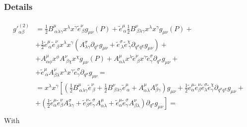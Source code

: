 \documentclass[letterpaper,10pt,english]{jupyterBook}
\begin{document}
\subsubsection*{Details}
\begin{equation*}
\begin{split}\begin{aligned}
   {g'}_{\alpha \beta}^{(2)} & =
   \frac{1}{2} B^{\mu}_{\ \alpha \lambda \gamma} x^\lambda x^\gamma \widetilde{e}^{\nu}_{\ \beta} g_{\mu \nu}(P) +
   \widetilde{e}^{\mu}_{\ \alpha} \frac{1}{2} B^{\nu}_{\ \beta \lambda \gamma} x^\lambda x^\gamma g_{\mu \nu}(P) + \\
   & + \frac{1}{2} \widetilde{e}^{\mu}_{\ \alpha} \widetilde{e}^{\nu}_{\ \beta} x^\lambda x^\gamma \left( A^{\sigma}_{\lambda \gamma} \partial_{q^\sigma} g_{\mu \nu} + \widetilde{e}^{\sigma}_{\ \lambda} \widetilde{e}^{\chi}_{\ \gamma} \partial_{q^\sigma q^\chi} g_{\mu \nu}  \right) + \\
   & + 
   A^{\mu}_{\alpha \phi} x^\phi A^{\nu}_{\ \beta \chi} x^\chi g_{\mu \nu}(P) +
   A^{\mu}_{\alpha \lambda} x^\lambda \widetilde{e}^{\nu}_{\ \beta} x^\gamma \widetilde{e}^{\sigma}_{\gamma} \partial_{q^\sigma} g_{\mu \nu} + \\
   & + \widetilde{e}^{\mu}_{\ \alpha} A^{\nu}_{\beta \lambda} x^\lambda x^\gamma \widetilde{e}^{\sigma}_{\gamma} \partial_{q^\sigma} g_{\mu \nu} = \\
   & = x^\lambda x^\gamma \left[ \left( \frac{1}{2} B^{\mu}_{\ \alpha \lambda \gamma} \widetilde{e}^{\nu}_{\ \beta} + \frac{1}{2} B^{\nu}_{\ \beta \lambda \gamma} \widetilde{e}^{\mu}_{\ \alpha} + A^{\mu}_{\alpha \lambda} A^{\nu}_{\beta \gamma} \right) g_{\mu \nu}  
   + \frac{1}{2} \widetilde{e}^{\mu}_{\alpha} \widetilde{e}^{\nu}_{\beta} \widetilde{e}^{\sigma}_{\lambda} \widetilde{e}^{\chi}_{\gamma} \partial_{q^\sigma q^\chi} g_{\mu \nu} \right. + \\ 
   & + \left. \left( 
   \frac{1}{2} \widetilde{e}^{\mu}_{\alpha} \widetilde{e}^{\nu}_{\beta} A^{\sigma}_{\lambda \gamma} + 
   \widetilde{e}^{\nu}_{\beta} \widetilde{e}^{\sigma}_{\gamma} A^{\mu}_{\alpha \lambda} + 
   \widetilde{e}^{\mu}_{\alpha} \widetilde{e}^{\sigma}_{\gamma} A^{\nu}_{\beta \lambda}   
   \right) \partial_{q^\sigma} g_{\mu \nu} \right] = \\
\end{aligned}\end{split}
\end{equation*}
\sphinxAtStartPar
With
\end{document}
